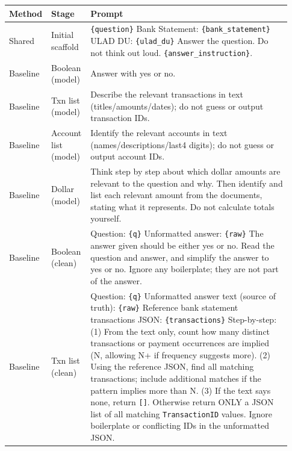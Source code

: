 \documentclass[11pt]{article}
\begin{document}
\renewcommand{\arraystretch}{1.15}
\begin{table}[h]
\centering
\small
\begin{tabular}{p{0.10\linewidth} p{0.13\linewidth} p{0.70\linewidth}}
\toprule
\textbf{Method} & \textbf{Stage} & \textbf{Prompt} \\
\midrule
Shared & Initial scaffold &
\texttt{\{question\}}\newline\newline
Bank Statement: \texttt{\{bank\_statement\}}\newline\newline
ULAD DU: \texttt{\{ulad\_du\}}\newline\newline
Answer the question. Do not think out loud. \texttt{\{answer\_instruction\}}. \\
\midrule
Baseline & Boolean (model) &
Answer with yes or no. \\
Baseline & Txn list (model) &
Describe the relevant transactions in text (titles/amounts/dates); do not guess or output transaction IDs. \\
Baseline & Account list (model) &
Identify the relevant accounts in text (names/descriptions/last4 digits); do not guess or output account IDs. \\
Baseline & Dollar (model) &
Think step by step about which dollar amounts are relevant to the question and why. Then identify and list each relevant amount from the documents, stating what it represents. Do not calculate totals yourself. \\
\midrule
Baseline & Boolean (clean) &
Question: \texttt{\{q\}}\newline
Unformatted answer: \texttt{\{raw\}}\newline
The answer given should be either yes or no. Read the question and answer, and simplify the answer to yes or no. Ignore any boilerplate; they are not part of the answer. \\
Baseline & Txn list (clean) &
Question: \texttt{\{q\}}\newline
Unformatted answer text (source of truth): \texttt{\{raw\}}\newline
Reference bank statement transactions JSON: \texttt{\{transactions\}}\newline
Step-by-step: (1) From the text only, count how many distinct transactions or payment occurrences are implied (N, allowing N+ if frequency suggests more). (2) Using the reference JSON, find all matching transactions; include additional matches if the pattern implies more than N. (3) If the text says none, return \texttt{[]}. Otherwise return ONLY a JSON list of all matching \texttt{TransactionID} values. Ignore boilerplate or conflicting IDs in the unformatted JSON. \\

\end{tabular}
\end{table}
\end{document}

